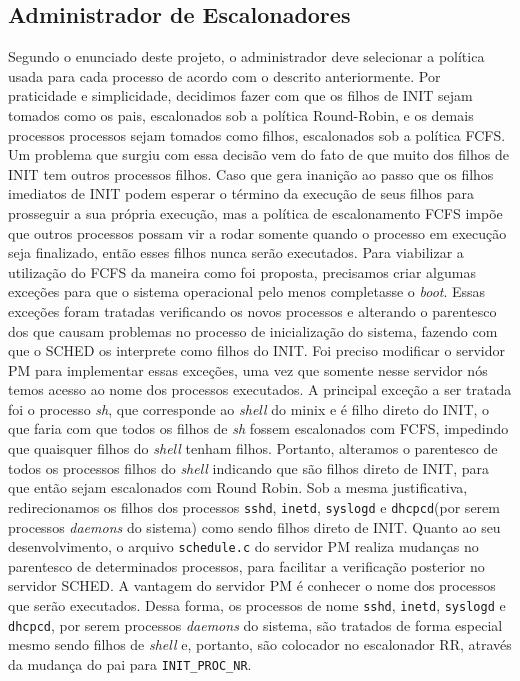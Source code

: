 \documentclass[12pt,journal,compsoc]{IEEEtran}
\begin{document}
\subsection{Administrador de Escalonadores}
	Segundo o enunciado deste projeto, o administrador deve selecionar a política usada para cada processo de acordo com o descrito anteriormente. Por praticidade e simplicidade, decidimos fazer com que os filhos de INIT sejam tomados como os pais, escalonados sob a política Round-Robin, e os demais processos processos sejam tomados como filhos, escalonados sob a política FCFS.
	Um problema que surgiu com essa decisão vem do fato de que muito dos filhos de INIT tem outros processos filhos. Caso que gera inanição ao passo que os filhos imediatos de INIT podem esperar o término da execução de seus filhos para prosseguir a sua própria execução, mas a política de escalonamento FCFS impõe que outros processos possam vir a rodar somente quando o processo em execução seja finalizado, então esses filhos nunca serão executados. Para viabilizar a utilização do FCFS da maneira como foi proposta, precisamos criar algumas exceções para que o sistema operacional pelo menos completasse o \textit{boot}. Essas exceções foram tratadas verificando os novos processos e alterando o parentesco dos que causam problemas no processo de inicialização do sistema, fazendo com que o SCHED os interprete como filhos do INIT.
    Foi preciso modificar o servidor PM para implementar essas exceções, uma vez que somente nesse servidor nós temos acesso ao nome dos processos executados. A principal exceção a ser tratada foi o processo \textit{sh}, que corresponde ao \textit{shell} do minix e é filho direto do INIT, o que faria com que todos os filhos de \textit{sh} fossem escalonados com FCFS, impedindo que quaisquer filhos do \textit{shell} tenham filhos. Portanto, alteramos o parentesco de todos os processos filhos do \textit{shell} indicando que são filhos direto de INIT, para que então sejam escalonados com Round Robin. Sob a mesma justificativa, redirecionamos os filhos dos processos \texttt{sshd}, \texttt{inetd}, \texttt{syslogd} e \texttt{dhcpcd}(por serem processos \textit{daemons} do sistema) como sendo filhos direto de INIT.
	Quanto ao seu desenvolvimento, o arquivo \texttt{schedule.c} do servidor PM realiza mudanças no parentesco de determinados processos, para facilitar a verificação posterior no servidor SCHED. A vantagem do servidor PM é conhecer o nome dos processos que serão executados. Dessa forma, os processos de nome \texttt{sshd}, \texttt{inetd}, \texttt{syslogd} e \texttt{dhcpcd}, por serem processos \textit{daemons} do sistema, são tratados de forma especial mesmo sendo filhos de \textit{shell} e, portanto, são colocador no escalonador RR, através da mudança do pai para \texttt{INIT\_PROC\_NR}.
        
\end{document}
